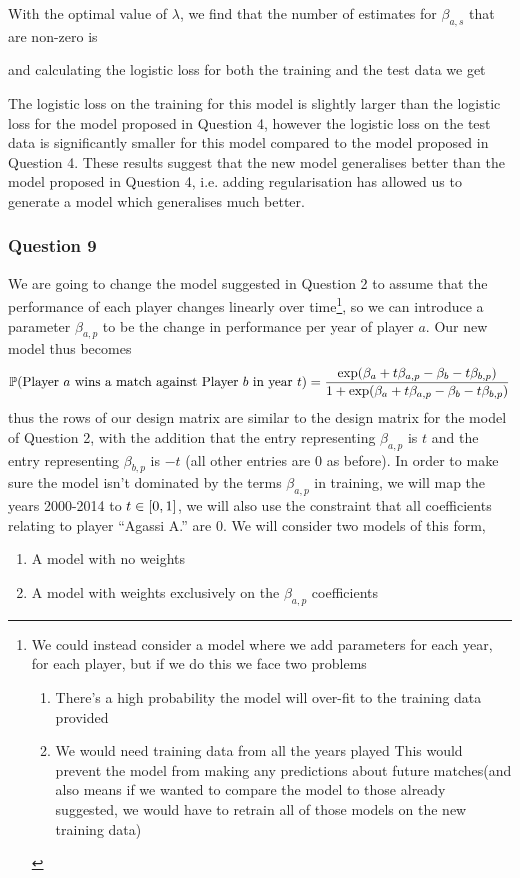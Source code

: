 \documentclass[11pt]{article} %
\let\originalleft\left
\let\originalright\right
\renewcommand{\left}{\mathopen{}\mathclose\bgroup\originalleft}
\renewcommand{\right}{\aftergroup\egroup\originalright}
\begin{document}
With the optimal value of $\lambda$, we find that the number of estimates for $\beta_{a, s}$ that are non-zero is

and calculating the logistic loss for both the training and the test data we get

The logistic loss on the training for this model is slightly larger than the logistic loss for the model proposed in Question 4, however the logistic loss on the test data is significantly smaller for this model compared to the model proposed in Question 4. These results suggest that the new model generalises better than the model proposed in Question 4, i.e. adding regularisation has allowed us to generate a model which generalises much better.

\subsubsection*{Question 9}
We are going to change the model suggested in Question 2 to assume that the performance of each player changes linearly over time\footnote{
We could instead consider a model where we add parameters for each year, for each player, but if we do this we face two problems
\begin{enumerate}
	\item There's a high probability the model will over-fit to the training data provided
	\item We would need training data from all the years played
		\subitem This would prevent the model from making any predictions about future matches(and also means if we wanted to compare the model to those already suggested, we would have to retrain all of those models on the new training data)
\end{enumerate}
}, so we can introduce a parameter $\beta_{a, p}$ to be the change in performance per year of player $a$. Our new model thus becomes
\begin{equation*}
	\mathbb{P}\left(\text{Player }a\text{ wins a match against Player }b\text{ in year }t\right) = \frac{\exp\left(\beta_a + t\beta_{a, p} - \beta_b - t\beta_{b, p}\right)}{1+\exp\left(\beta_a + t\beta_{a, p} - \beta_b - t\beta_{b, p}\right)}
\end{equation*}
thus the rows of our design matrix are similar to the design matrix for the model of Question 2, with the addition that the entry representing $\beta_{a, p}$ is $t$ and the entry representing $\beta_{b, p}$ is $-t$ (all other entries are 0 as before). In order to make sure the model isn't dominated by the terms $\beta_{a, p}$ in training, we will map the years 2000-2014 to $t \in \left[0, 1\right]$, we will also use the constraint that all coefficients relating to player ``Agassi A.'' are 0. We will consider two models of this form, 
\begin{enumerate}
	\item A model with no weights
	\item A model with weights exclusively on the $\beta_{a, p}$ coefficients
\end{enumerate}
\end{document}
